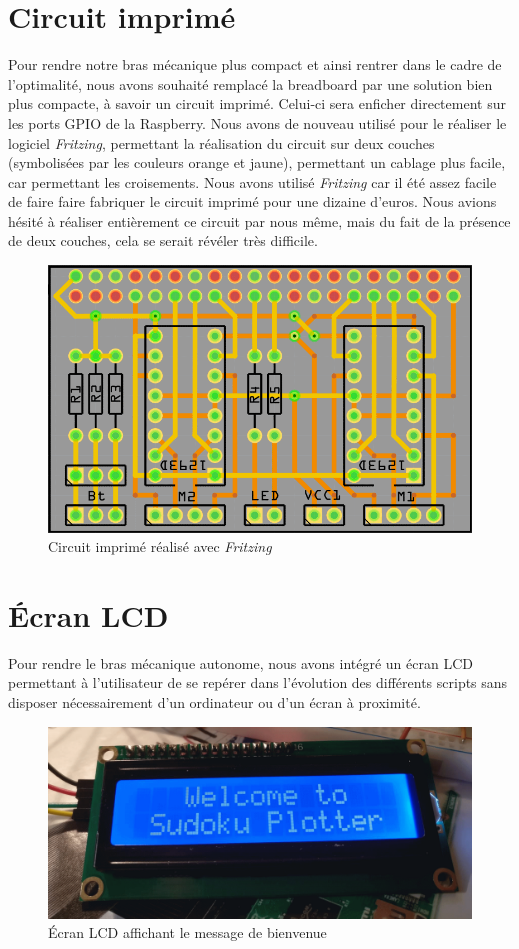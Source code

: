\documentclass[12pt,a4paper]{report}
\begin{document}
\section{Circuit imprimé}
Pour rendre notre bras mécanique plus compact et ainsi rentrer dans le cadre de l'optimalité, nous avons souhaité remplacé la breadboard par une solution bien plus compacte, à savoir un circuit imprimé. Celui-ci sera enficher directement sur les ports GPIO de la Raspberry. Nous avons de nouveau utilisé pour le réaliser le logiciel \emph{Fritzing}, permettant la réalisation du circuit sur deux couches (symbolisées par les couleurs orange et jaune), permettant un cablage plus facile, car permettant les croisements. Nous avons utilisé \emph{Fritzing} car il été assez facile de faire faire fabriquer le circuit imprimé pour une dizaine d'euros. Nous avions hésité à réaliser entièrement ce circuit par nous même, mais du fait de la présence de deux couches, cela se serait révéler très difficile.

\begin{figure}[!h]
 \center
 \includegraphics[scale=0.5]{../pictures/Sudoku_circuit_imprime.png}
 \caption{Circuit imprimé réalisé avec \emph{Fritzing}}
\end{figure}

\section{Écran LCD}
Pour rendre le bras mécanique autonome, nous avons intégré un écran LCD permettant à l'utilisateur de se repérer dans l'évolution des différents scripts sans disposer nécessairement d'un ordinateur ou d'un écran à proximité.
\begin{figure}[!h]
 \center
 \includegraphics[scale=0.3]{../pictures/ecran_lcd}
 \caption{\'{E}cran LCD affichant le message de bienvenue}
\end{figure}
\end{document}
